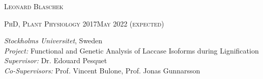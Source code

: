 \documentclass[11pt]{article}
\begin{document}
	\setlength\parindent{15pt}
\begin{center}
	\huge{\textsc{Leonard Blaschek}}
	\vspace*{0.2cm}
\end{center}

\vspace{0.1cm}

\textsc{\large{PhD, Plant Physiology} \hfill \textsc{2017\textendash May 2022 \textnormal{(expected)}}}
\begin{addmargin}[24pt]{0pt}
	\textit{Stockholms Universitet}, Sweden \\
	\textit{Project:} Functional and Genetic Analysis of Laccase Isoforms during Lignification \\
	\textit{Supervisor:} Dr. Edouard Pesquet \\
	\textit{Co-Supervisors:} Prof. Vincent Bulone, Prof. Jonas Gunnarsson
	\vspace{0.1cm} \\
\end{addmargin}
\vspace{0.2cm}
\end{document}
